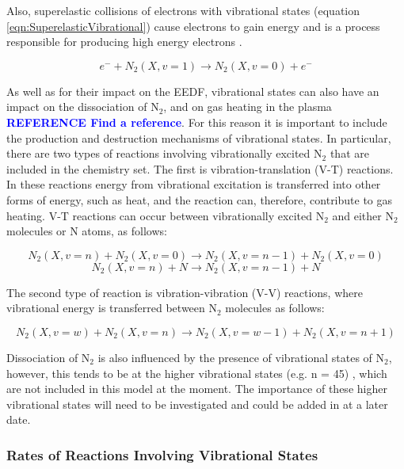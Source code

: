 \documentclass[11pt, oneside]{article}   	%
\newcommand{\toref}[1]{ \textcolor{blue}{\bf{REFERENCE #1}}}
\begin{document}
Also, superelastic collisions of electrons with vibrational states (equation \ref{eqn:SuperelasticVibrational}) cause electrons to gain energy and is a process responsible for producing high energy electrons \cite{Guerra2004kinetic}.

\begin{equation}
e^- + N_2(X,v=1) \rightarrow N_2(X,v=0) + e^-
\label{eqn:SuperelasticVibrational}
\end{equation}

As well as for their impact on the EEDF, vibrational states can also have an impact on the dissociation of N$_2$, and on gas heating in the plasma \toref{Find a reference}.
For this reason it is important to include the production and destruction mechanisms of vibrational states.
In particular, there are two types of reactions involving vibrationally excited N$_2$ that are included in the chemistry set.
The first is vibration-translation (V-T) reactions. In these reactions energy from vibrational excitation is transferred into other forms of energy, such as heat, and the reaction can, therefore, contribute to gas heating.
V-T reactions can occur between vibrationally excited N$_2$ and either N$_2$ molecules or N atoms, as follows:

\begin{equation}
N_2(X,v=n) + N_2 (X,v=0) \rightarrow N_2(X,v=n-1) + N_2(X,v=0)
\label{eqn:V-TN2}
\end{equation}
\begin{equation}
N_2(X,v=n) + N \rightarrow N_2(X,v=n-1) + N
\label{eqn:V-TN}
\end{equation}

The second type of reaction is vibration-vibration (V-V) reactions, where vibrational energy is transferred between N$_2$ molecules as follows:

\begin{equation}
N_2(X,v=w) + N_2 (X,v=n) \rightarrow N_2(X,v=w-1) + N_2(X,v=n+1)
\label{eqn:V-V}
\end{equation}

Dissociation of N$_2$ is also influenced by the presence of vibrational states of N$_2$, however, this tends to be at the higher vibrational states (e.g. n = 45) \cite{Guerra2004kinetic}, which are not included in this model at the moment. 
The importance of these higher vibrational states will need to be investigated and could be added in at a later date.


\subsubsection{Rates of Reactions Involving Vibrational States}
\end{document}
